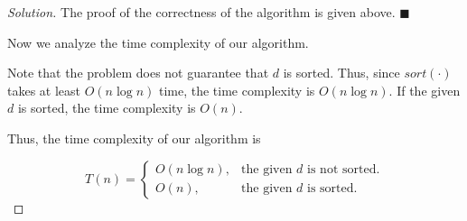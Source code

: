 \documentclass{article}
\renewcommand{\qedsymbol}{\hfill $\blacksquare$\par}
\newenvironment{solution}{\begin{proof}[\noindent\it Solution]}{\end{proof}}
\begin{document}
\begin{solution}
    \hspace{2.6em}
    The proof of the correctness of the algorithm is given above. \qedsymbol
    
    \vspace{3em} \hspace{2.6em}
    Now we analyze the time complexity of our algorithm.
    
    \hspace{2.6em}
    Note that the problem does not guarantee that $d$ is sorted. Thus, since $sort(\cdot)$ takes at least $O(n\log n)$ time, the time complexity is $O(n\log n).$ If the given $d$ is sorted, the time complexity is $O(n).$
    
    \hspace{2.6em}
    Thus, the time complexity of our algorithm is 
    
    $$T(n)=\left\{\begin{array}{ll}
        O(n\log n), &  \text{the given }d\text{ is not sorted.}\\
        O(n), & \text{the given }d\text{ is sorted.}
    \end{array}\right.$$
    
    \vspace{-3em}
\end{solution}
\vspace{2em}
\end{document}

